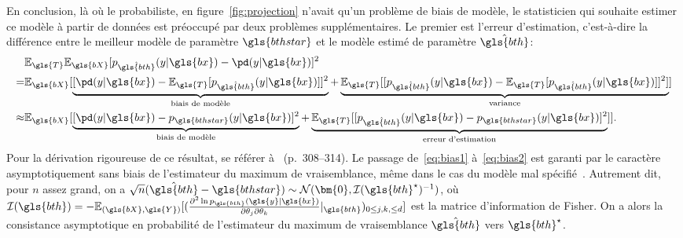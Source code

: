 En conclusion, là où le probabiliste, en figure~\ref{fig:projection} n'avait qu'un problème de biais de modèle, le statisticien qui souhaite estimer ce modèle à partir de données est préoccupé par deux problèmes supplémentaires. Le premier est l'erreur d'estimation, c'est-à-dire la différence entre le meilleur modèle de paramètre $\gls{bthstar}$ et le modèle estimé de paramètre $\hat{\gls{bth}}$:
\begin{align}
 & \mathbb{E}_{\gls{T}} \mathbb{E}_{\gls{bX}} [p_{\hat{\gls{bth}}}(y| \gls{bx}) - \pd(y| \gls{bx})]^2  \nonumber \\
= & \mathbb{E}_{\gls{bX}} [ \underbrace{[\pd(y| \gls{bx}) - \mathbb{E}_{\gls{T}} [ p_{\hat{\gls{bth}}}(y| \gls{bx})]]^2}_{\text{biais de modèle}} + \underbrace{\mathbb{E}_{\gls{T}} [[ p_{\hat{\gls{bth}}}(y| \gls{bx}) - \mathbb{E}_{\gls{T}} [ p_{\hat{\gls{bth}}}(y| \gls{bx}) ]]^2]}_{\text{variance}} ] \label{eq:bias1} \\
\approx & \mathbb{E}_{\gls{bX}} [ \underbrace{[\pd(y| \gls{bx}) - p_{\gls{bthstar}}(y| \gls{bx})]^2}_{\text{biais de modèle}} + \underbrace{\mathbb{E}_{\gls{T}} [[ p_{\hat{\gls{bth}}}(y| \gls{bx}) - p_{\gls{bthstar}}(y| \gls{bx})  ]^2}_{\text{erreur d'estimation}} ]]. \label{eq:bias2}
\end{align}
Pour la dérivation rigoureuse de ce résultat, se référer à~\cite{schutze2008introduction} (p.\ 308–314). Le passage de~\ref{eq:bias1} à~\ref{eq:bias2} est garanti par le caractère asymptotiquement sans biais de l'estimateur du maximum de vraisemblance, même dans le cas du modèle mal spécifié~\cite{white1982maximum}. Autrement dit, pour $n$ assez grand, on a $\sqrt{n} (\hat{\gls{bth}} - \gls{bthstar}) \sim \mathcal{N}(\bm{0} , \mathcal{I}(\gls{bth}^\star)^{-1})$, où $\mathcal{I}(\gls{bth}) = - \mathbb{E}_{(\gls{bX}, \gls{Y})}[ (\frac{\partial^2 \ln p_{\gls{bth}}(\gls{y} | \gls{bx})}{\partial \theta_j \partial \theta_k} |_{\gls{bth}})_{0 \leq j,k, \leq d}]$ est la matrice d'information de Fisher. On a alors la consistance asymptotique en probabilité de l'estimateur du maximum de vraisemblance $\hat{\gls{bth}}$ vers $\gls{bth}^\star$.
